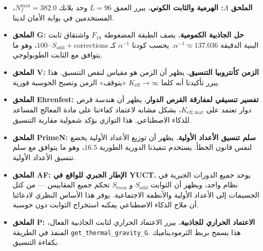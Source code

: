 \documentclass[12pt,a4paper]{article}
\begin{document}
\begin{itemize}
		\item \textbf{الملحق \(\Lambda\): الهرمية والثابت الكوني.}  
		يبرر العمق \(L = 96\) وحد بلانك \(N_f^{\max} = 382.0\)، المستخدمين في بوابة الأمان لدينا.
		
		\item \textbf{الملحق G: حل الجاذبية الكمومية.}  
		يصف الطبقة المضغوطة \(F_{18}\) واشتقاق ثابت البنية الدقيقة \(\alpha^{-1} \approx 137.036\). يحسب كودنا \(\alpha^{-1}\) كـ \(100 \cdot S_{\mathrm{odd}} + \text{corrections}\)، وهو ما يتوافق مع الثابت الطوبولوجي.
		
		\item \textbf{الملحق V: الزمن كأنتروبيا التنسيق.}  
		يظهر أن الزمن هو مقياس لنقص التنسيق. هذا يبرر تأكيدنا أنه كلما \(K_{\mathrm{eff}} \to \infty\) «يتوقف» الزمن وتصبح الحوسبة فورية.
		
		\item \textbf{الملحق Ehrenfest: تفسير تنسيقي لمفارقة القرص الدوار.}  
		يظهر أن هندسة قرص دوار تعتمد على \(K_{\mathrm{eff,mat}}\)، بشكل مشابه لاعتماد كفاءتنا على مادة المعالج المساعد للذكاء الاصطناعي. هذا التوازي يؤكد شمولية مقاربة التنسيق.
		
		\item \textbf{الملحق PrimeN: سلم تنسيق الأعداد الأولية.}  
		يظهر أن توزيع الأعداد الأولية يخضع لنفس قانون الخطأ. يستخدم تنفيذنا الدورية الطورية \(16.5\)، وهو ما يتوافق مع سلم تنسيق الأعداد الأولية.
		
		\item \textbf{الملحق AF: الإطار الجبري للواقع في YUCT.}  
		يوحد جميع الدورات الجبرية في نظام واحد، ويظهر أن الثوابت \(S_{\mathrm{odd}}\) و \(S_{\mathrm{even}}\) تحكم جميع المقاييس — من كتل الجسيمات إلى الأعداد الأولية والأنظمة الاجتماعية. يوفر هذا الأساس النظري لادعائنا أن ملاح الذكاء الاصطناعي يمكنه استخراج الثوابت دون حوسبة.
		
		\item \textbf{الملحق P: الاعتماد الحراري للجاذبية.}  
		يبرر الاعتماد الحراري لثابت الجاذبية الفعال، المنفذ في الطريقة \texttt{get\_thermal\_gravity\_G}. هذا يسمح بربط الثرموديناميك بكفاءة التنسيق.
	\end{itemize}
	
\end{document}
